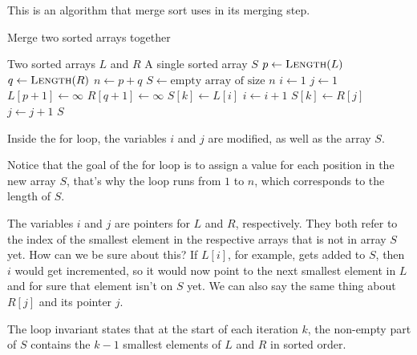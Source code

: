 \begin{example}
    This is an algorithm that merge sort uses in its merging step.
    \begin{algorithm}[H]
        \caption{Merge two sorted arrays together}
        \begin{algorithmic}[1]
            \Require Two sorted arrays $L$ and $R$
            \Ensure A single sorted array $S$
                \State $p \gets \text{\Call{Length}{$L$}}$
                \State $q \gets \text{\Call{Length}{$R$}}$
                \State $n \gets p + q$
                \State $S \gets \text{empty array of size $n$}$
                \State $i \gets 1$
                \State $j \gets 1$
                \State $L[p+1] \gets \infty$
                \State $R[q+1] \gets \infty$
                        \State $S[k] \gets L[i]$
                        \State $i \gets i+1$
                    \Else
                        \State $S[k] \gets R[j]$
                        \State $j \gets j+1$
                    \EndIf
                \EndFor
                \Return $S$
            \EndFunction
        \end{algorithmic}
    \end{algorithm}

    Inside the for loop, the variables $i$ and $j$ are modified, as well as the array $S$. %

    Notice that the goal of the for loop is to assign a value for each position in the new array $S$, that's why the loop runs from $1$ to $n$, which corresponds to the length of $S$. 

    The variables $i$ and $j$ are pointers for $L$ and $R$, respectively. They both refer to the index of the smallest element in the respective arrays that is not in array $S$ yet. How can we be sure about this? If $L[i]$, for example, gets added to $S$, then $i$ would get incremented, so it would now point to the next smallest element in $L$ and for sure that element isn't on $S$ yet. We can also say the same thing about $R[j]$ and its pointer $j$.


    The loop invariant states that at the start of each iteration $k$, the non-empty part of $S$ contains the $k-1$ smallest elements of $L$ and $R$ in sorted order.
\end{example}

